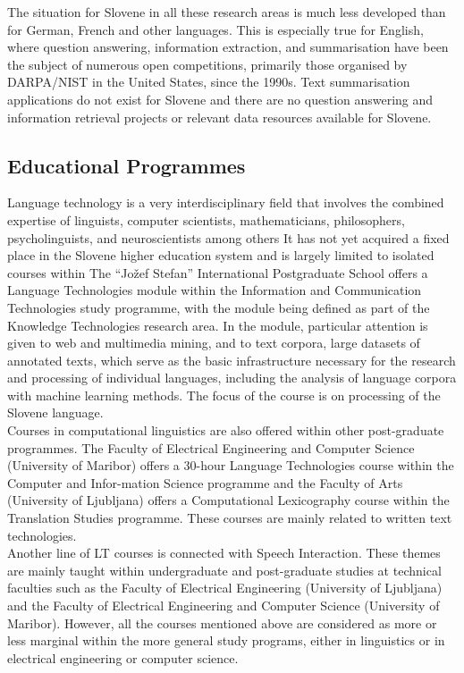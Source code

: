 \begin{multicols}{2}
The situation for Slovene in all these research areas is much less developed than for German, French and other languages. This is especially true for English, where question answering, information extraction, and summarisation have been the subject of numerous open competitions, primarily those organised by DARPA/NIST in the United States, since the 1990s. Text summarisation applications do not exist for Slovene and there are no question answering and information retrieval projects or relevant data resources available for Slovene.

\subsection{Educational Programmes}

Language technology is a very interdisciplinary field that involves the combined expertise of linguists, computer scientists, mathematicians, philosophers, psycholinguists, and neuroscientists among others It has not yet acquired a fixed place in the Slovene higher education system and is largely limited to isolated courses within The “Jožef Stefan” International Postgraduate School offers a Language Technologies module within the Information and Communication Technologies study programme, with the module being defined as part of the Knowledge Technologies research area. In the module, particular attention is given to web and multimedia mining, and to text corpora, large datasets of annotated texts, which serve as the basic infrastructure necessary for the research and processing of individual languages, including the analysis of language corpora with machine learning methods. The focus of the course is on processing of the Slovene language.\\
Courses in computational linguistics are also offered within other post-graduate programmes. The Faculty of Electrical Engineering and Computer Science (University of Maribor) offers a 30-hour Language Technologies course within the Computer and Infor-mation Science programme and the Faculty of Arts (University of Ljub\-ljana) offers a Computational Lexicography course within the Translation Studies programme. These courses are mainly related to written text technologies.\\
Another line of LT courses is connected with Speech Interaction. These themes are mainly taught within undergraduate and post-graduate studies at technical faculties such as the Faculty of Electrical Engineering (University of Ljub\-ljana) and the Faculty of Electrical Engineering and Computer Science (University of Maribor). However, all the courses mentioned above are considered as more or less marginal within the more general study programs, either in linguistics or in electrical engineering or computer science.


\end{multicols}
